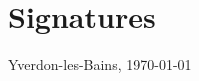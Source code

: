 \documentclass[a4paper,12pt,oneside]{article}
\begin{document}
	
	\thispagestyle{empty}
	\setcounter{page}{1}
\newpage


    \tableofcontents
    \newpage


	
	

	

	\section{Signatures}


 \begin{flushright}
Yverdon-les-Bains, \today\\
\nomAuteur
\end{flushright}

    \appendix
    \newpage
    

\end{document}

